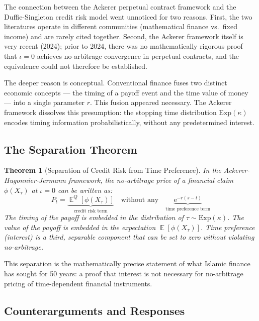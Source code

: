\documentclass[10pt,twocolumn]{article}
\theoremstyle{plain}
\newtheorem{theorem}{Theorem}
\theoremstyle{definition}
\DeclareMathOperator{\E}{\mathbb{E}}
\begin{document}
The connection between the Ackerer perpetual contract framework
and the Duffie-Singleton credit risk model went unnoticed for
two reasons. First, the two literatures operate in different
communities (mathematical finance vs.\ fixed income) and are
rarely cited together. Second, the Ackerer framework itself is
very recent (2024); prior to 2024, there was no mathematically
rigorous proof that $\iota = 0$ achieves no-arbitrage convergence
in perpetual contracts, and the equivalence could not therefore
be established.

The deeper reason is conceptual. Conventional finance fuses two
distinct economic concepts --- the timing of a payoff event and
the time value of money --- into a single parameter $r$. This
fusion appeared necessary. The Ackerer framework dissolves this
presumption: the stopping time distribution $\mathrm{Exp}(\kappa)$
encodes timing information probabilistically, without any
predetermined interest.

\subsection{The Separation Theorem}

\begin{theorem}[Separation of Credit Risk from Time Preference]
\label{thm:separation}
In the Ackerer-Hugonnier-Jermann framework, the no-arbitrage
price of a financial claim $\phi(X_\tau)$ at $\iota = 0$ can
be written as:
\begin{equation}
P_t = \underbrace{\E^Q[\phi(X_\tau)]}_{\text{credit risk term}}
\quad\text{without any}\quad
\underbrace{\mathrm{e}^{-r(s-t)}}_{\text{time preference term}}
\label{eq:separation}
\end{equation}
The timing of the payoff is embedded in the distribution of
$\tau \sim \mathrm{Exp}(\kappa)$. The value of the payoff is
embedded in the expectation $\E[\phi(X_\tau)]$. Time preference
(interest) is a third, separable component that can be set to
zero without violating no-arbitrage.
\end{theorem}

This separation is the mathematically precise statement of what
Islamic finance has sought for 50 years: a proof that interest
is not necessary for no-arbitrage pricing of time-dependent
financial instruments.

\subsection{Counterarguments and Responses}
\end{document}
